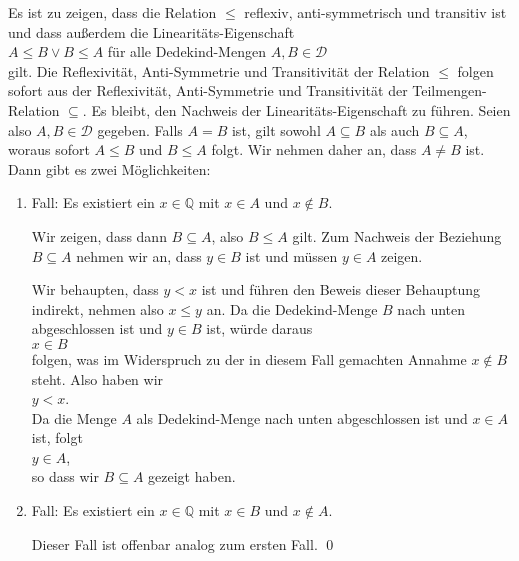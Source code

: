 \solution
Es ist zu zeigen, dass die Relation $\leq$ reflexiv, anti-symmetrisch und transitiv ist und dass au\ss{}erdem die Linearit\"ats-Eigenschaft
\\[0.2cm]
\hspace*{1.3cm} $A \leq B \vee B \leq A$ \quad f\"ur alle Dedekind-Mengen $A,B \in \mathcal{D}$
\\[0.2cm]
gilt.  Die Reflexivit\"at, Anti-Symmetrie und Transitivit\"at der Relation $\leq$ folgen sofort aus der Reflexivit\"at,
Anti-Symmetrie und Transitivit\"at der Teilmengen-Relation $\subseteq$.  Es bleibt, den Nachweis der
Linearit\"ats-Eigenschaft zu f\"uhren.  Seien also $A,B \in \mathcal{D}$ gegeben.  Falls $A = B$ ist, gilt sowohl
$A \subseteq B$ als auch $B \subseteq A$, woraus sofort $A \leq B$ und $B \leq A$ folgt.  Wir nehmen
daher an, dass $A \not= B$ ist.  Dann gibt es zwei M\"oglichkeiten:
\begin{enumerate}
\item Fall: Es existiert ein $x \in \mathbb{Q}$ mit $x \in A$ und $x \not\in B$.

            Wir zeigen, dass dann $B \subseteq A$, also $B \leq A$ gilt.  Zum Nachweis der Beziehung
            $B \subseteq A$ nehmen wir an, dass $y \in B$ ist und m\"ussen $y \in A$ zeigen.

            Wir behaupten, dass $y < x$ ist und f\"uhren den Beweis dieser Behauptung indirekt, nehmen also
            $x \leq y$ an.  Da die Dedekind-Menge $B$ nach unten abgeschlossen ist und $y \in B$ ist, w\"urde daraus
            \\[0.2cm]
            \hspace*{1.3cm}
            $x \in B$
            \\[0.2cm]
            folgen, was im Widerspruch zu der in diesem Fall gemachten Annahme $x \not\in B$ steht.  Also
            haben wir
            \\[0.2cm]
            \hspace*{1.3cm}
            $y < x$.
            \\[0.2cm]
            Da die Menge $A$ als Dedekind-Menge nach unten abgeschlossen ist und $x \in A$ ist, folgt
            \\[0.2cm]
            \hspace*{1.3cm}
            $y \in A$,
            \\[0.2cm]
            so dass wir $B \subseteq A$ gezeigt haben.
\item Fall: Es existiert ein $x \in \mathbb{Q}$ mit $x \in B$ und $x \not\in A$.

            Dieser Fall ist offenbar analog zum ersten Fall.
            \qed
\end{enumerate}


